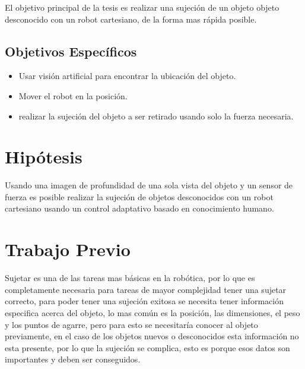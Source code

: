 El objetivo principal de la tesis es realizar una sujeción de un objeto objeto desconocido con un robot cartesiano, de la forma mas rápida posible.

\subsection{Objetivos Específicos}
\begin{itemize}
	 
\item Usar visión artificial para encontrar la ubicación del objeto.


\item Mover el robot en la posición.


\item realizar la sujeción del objeto a ser retirado usando solo la fuerza necesaria.


\end{itemize}





\section{Hipótesis}
Usando una imagen de profundidad de una sola vista del objeto y un sensor de fuerza es posible realizar la sujeción de objetos desconocidos con un robot cartesiano usando un control adaptativo basado en conocimiento humano.




\section{Trabajo Previo}
Sujetar es una de las tareas mas básicas en la robótica, por lo que es completamente necesaria para tareas de mayor complejidad tener una sujetar correcto, para poder tener una sujeción exitosa se necesita tener información especifica acerca del objeto, lo mas común es la posición, las dimensiones, el peso y los puntos de agarre, pero para esto se necesitaría conocer al objeto previamente, en el caso de los objetos nuevos o desconocidos esta información no esta presente, por lo que la sujeción se complica, esto es porque esos datos son importantes y deben ser conseguidos.


